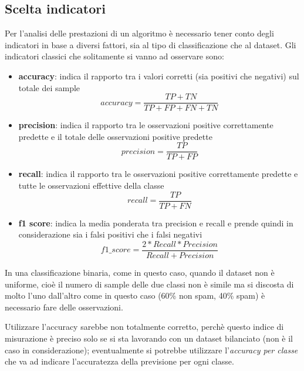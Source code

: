 \documentclass[12pt,a4paper]{article}
\begin{document}
\subsection{Scelta indicatori}
Per l'analisi delle prestazioni di un algoritmo è necessario tener conto degli indicatori in base a diversi fattori, sia al tipo di classificazione che al dataset.
Gli indicatori classici che solitamente si vanno ad osservare sono:
\begin{itemize}
    \item \textbf{accuracy}: indica il rapporto tra i valori corretti (sia positivi che negativi) sul totale dei sample
    \begin{equation}
         accuracy = \frac{ TP+TN}{TP+FP+FN+TN}
    \end{equation}

    \item \textbf{precision}: indica il rapporto tra le osservazioni positive correttamente predette e il totale delle osservazioni positive predette
    \begin{equation}
         precision = \frac{ TP}{TP+FP}
    \end{equation}

    \item \textbf{recall}: indica il rapporto tra le osservazioni positive correttamente predette e tutte le osservazioni effettive della classe
    \begin{equation}
         recall = \frac{TP}{TP+FN}
    \end{equation}

    \item \textbf{f1 score}: indica la media ponderata tra precision e recall e prende quindi in considerazione sia i falsi positivi che i falsi negativi
    \begin{equation}
         f1\_score = \frac{2*Recall * Precision}{Recall + Precision}
    \end{equation}
\end{itemize}
In una classificazione binaria, come in questo caso, quando il dataset non è uniforme, cioè il numero di sample delle due classi non è simile ma si discosta di molto l'uno dall'altro come in questo caso (60\% non spam, 40\% spam) è necessario fare delle osservazioni.

Utilizzare l'accuracy sarebbe non totalmente corretto, perchè questo indice di misurazione è preciso solo se si sta lavorando con un dataset bilanciato (non è il caso in considerazione);
eventualmente si potrebbe utilizzare l'\textit{accuracy per classe} che va ad indicare l'accuratezza della previsione per ogni classe.
\end{document}
